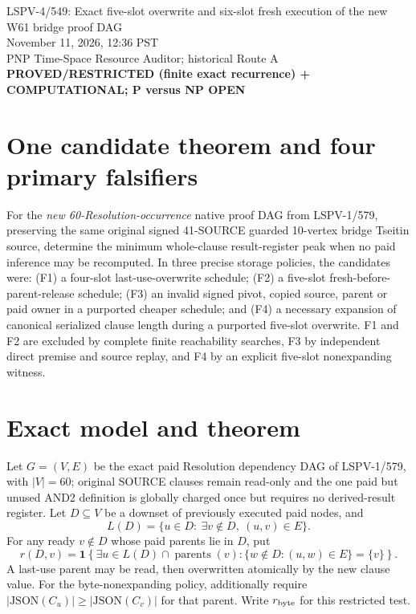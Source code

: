 \documentclass[11pt]{article}
\begin{document}
\begin{center}
{\Large LSPV-4/549: Exact five-slot overwrite and six-slot fresh execution of the new W61 bridge proof DAG}\\[5pt]
November 11, 2026, 12:36 PST\\
PNP Time-Space Resource Auditor; historical Route A\\
\textbf{PROVED/RESTRICTED (finite exact recurrence) + COMPUTATIONAL; P versus NP OPEN}
\end{center}

\section*{One candidate theorem and four primary falsifiers}
For the \emph{new 60-Resolution-occurrence} native proof DAG from LSPV-1/579, preserving the same original signed 41-SOURCE guarded 10-vertex bridge Tseitin source, determine the minimum whole-clause result-register peak when no paid inference may be recomputed. In three precise storage policies, the candidates were: (F1) a four-slot last-use-overwrite schedule; (F2) a five-slot fresh-before-parent-release schedule; (F3) an invalid signed pivot, copied source, parent or paid owner in a purported cheaper schedule; and (F4) a necessary expansion of canonical serialized clause length during a purported five-slot overwrite. F1 and F2 are excluded by complete finite reachability searches, F3 by independent direct premise and source replay, and F4 by an explicit five-slot nonexpanding witness.

\section*{Exact model and theorem}
Let $G=(V,E)$ be the exact paid Resolution dependency DAG of LSPV-1/579, with $|V|=60$; original SOURCE clauses remain read-only and the one paid but unused AND2 definition is globally charged once but requires no derived-result register. Let $D\subseteq V$ be a downset of previously executed paid nodes, and
\[
 L(D)=\{u\in D:\ \exists v\notin D,\ (u,v)\in E\}.
\]
For any ready $v\notin D$ whose paid parents lie in $D$, put
\[
 r(D,v)=\mathbf{1}\!\left\{\exists u\in L(D)\cap\operatorname{parents}(v):
    \{w\notin D:(u,w)\in E\}=\{v\}\right\}.
\]
A last-use parent may be read, then overwritten atomically by the new clause value. For the byte-nonexpanding policy, additionally require
$|\mathrm{JSON}(C_u)|\geq|\mathrm{JSON}(C_v)|$ for that parent. Write $r_{\rm byte}$ for this restricted test.
\end{document}
